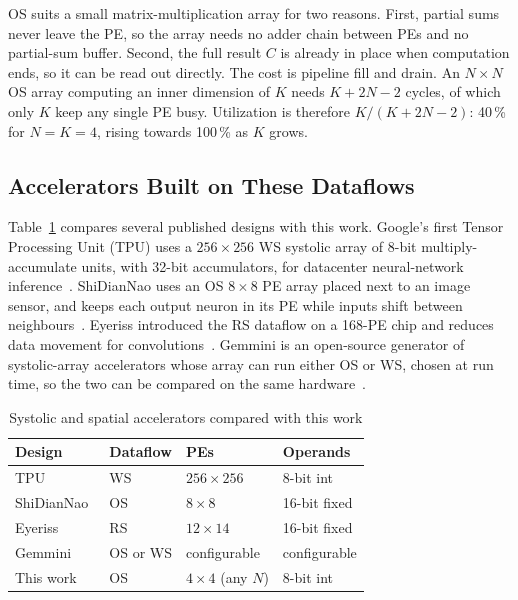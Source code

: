 OS suits a small matrix-multiplication array for two reasons. First, partial sums never leave the PE, so the array needs no adder chain between PEs and no partial-sum buffer. Second, the full result $C$ is already in place when computation ends, so it can be read out directly. The cost is pipeline fill and drain. An $N \times N$ OS array computing an inner dimension of $K$ needs $K + 2N - 2$ cycles, of which only $K$ keep any single PE busy. Utilization is therefore $K/(K + 2N - 2)$: 40\,\% for $N = K = 4$, rising towards 100\,\% as $K$ grows.

\subsection{Accelerators Built on These Dataflows}
Table~\ref{tab:litcompare} compares several published designs with this work. Google's first Tensor Processing Unit (TPU) uses a $256 \times 256$ WS systolic array of 8-bit multiply-accumulate units, with 32-bit accumulators, for datacenter neural-network inference~\cite{jouppi2017tpu}. ShiDianNao uses an OS $8 \times 8$ PE array placed next to an image sensor, and keeps each output neuron in its PE while inputs shift between neighbours~\cite{du2015shidiannao}. Eyeriss introduced the RS dataflow on a 168-PE chip and reduces data movement for convolutions~\cite{chen2016eyeriss, chen2017eyerissjssc}. Gemmini is an open-source generator of systolic-array accelerators whose array can run either OS or WS, chosen at run time, so the two can be compared on the same hardware~\cite{genc2021gemmini}.

\begin{table}[t]
\centering
\caption{Systolic and spatial accelerators compared with this work}
\label{tab:litcompare}
\footnotesize
\setlength{\tabcolsep}{4pt}
\begin{tabular}{@{}llll@{}}
\toprule
Design & Dataflow & PEs & Operands \\
\midrule
TPU~\cite{jouppi2017tpu} & WS & $256 \times 256$ & 8-bit int \\
ShiDianNao~\cite{du2015shidiannao} & OS & $8 \times 8$ & 16-bit fixed \\
Eyeriss~\cite{chen2017eyerissjssc} & RS & $12 \times 14$ & 16-bit fixed \\
Gemmini~\cite{genc2021gemmini} & OS or WS & configurable & configurable \\
This work & OS & $4 \times 4$ (any $N$) & 8-bit int \\
\bottomrule
\end{tabular}
\end{table}

